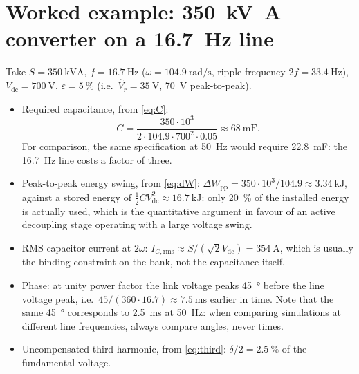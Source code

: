\documentclass[11pt,a4paper]{article}
\begin{document}
\section{Worked example: \SI{350}{\kilo\volt\ampere} converter on a \SI{16.7}{\hertz} line}

Take $S=\SI{350}{\kilo\volt\ampere}$, $f=\SI{16.7}{\hertz}$
($\omega = \SI{104.9}{\radian\per\second}$, ripple frequency
$2f=\SI{33.4}{\hertz}$), $V_{\mathrm{dc}}=\SI{700}{\volt}$,
$\varepsilon = \SI{5}{\percent}$ (i.e.\ $\hat V_r = \SI{35}{\volt}$,
\SI{70}{\volt} peak-to-peak).

\begin{itemize}
  \item Required capacitance, from \eqref{eq:C}:
        \begin{equation}
          C = \frac{350\cdot 10^{3}}
                   {2\cdot 104.9 \cdot 700^{2}\cdot 0.05}
            \approx \SI{68}{\milli\farad}.
        \end{equation}
        For comparison, the same specification at \SI{50}{\hertz} would require
        \SI{22.8}{\milli\farad}: the \SI{16.7}{\hertz} line costs a factor of
        three.
  \item Peak-to-peak energy swing, from \eqref{eq:dW}:
        $\Delta W_{\mathrm{pp}} = 350\cdot10^{3}/104.9 \approx \SI{3.34}{\kilo\joule}$,
        against a stored energy of
        $\tfrac12 C V_{\mathrm{dc}}^2 \approx \SI{16.7}{\kilo\joule}$: only
        \SI{20}{\percent} of the installed energy is actually used, which is the
        quantitative argument in favour of an active decoupling stage operating
        with a large voltage swing.
  \item RMS capacitor current at $2\omega$:
        $I_{C,\mathrm{rms}} \approx S/(\sqrt2 V_{\mathrm{dc}})
        = \SI{354}{\ampere}$, which is usually the binding constraint on the
        bank, not the capacitance itself.
  \item Phase: at unity power factor the link voltage peaks
        \SI{45}{\degree} before the line voltage peak, i.e.\
        $45/(360\cdot16.7) \approx \SI{7.5}{\milli\second}$ earlier in time.
        Note that the same \SI{45}{\degree} corresponds to \SI{2.5}{\milli\second}
        at \SI{50}{\hertz}: when comparing simulations at different line
        frequencies, always compare angles, never times.
  \item Uncompensated third harmonic, from \eqref{eq:third}:
        $\delta/2 = \SI{2.5}{\percent}$ of the fundamental voltage.
\end{itemize}
\end{document}
